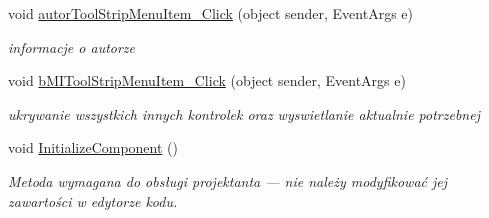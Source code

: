 \begin{DoxyCompactItemize}
void \mbox{\hyperlink{classkalku__all__in__one_1_1_form1_a15b1f2515415730a606a5a66dfe1ff00}{autor\+Tool\+Strip\+Menu\+Item\+\_\+\+Click}} (object sender, Event\+Args e)
\begin{DoxyCompactList}\small\item\em informacje o autorze \end{DoxyCompactList}\item 
\mbox{\label{classkalku__all__in__one_1_1_form1_ac0ccf231a44a19dbaa2a6398531d4f5d}} 
void \mbox{\hyperlink{classkalku__all__in__one_1_1_form1_ac0ccf231a44a19dbaa2a6398531d4f5d}{b\+M\+I\+Tool\+Strip\+Menu\+Item\+\_\+\+Click}} (object sender, Event\+Args e)
\begin{DoxyCompactList}\small\item\em ukrywanie wszystkich innych kontrolek oraz wyswietlanie aktualnie potrzebnej \end{DoxyCompactList}\item 
void \mbox{\hyperlink{classkalku__all__in__one_1_1_form1_acfb7737bb18b9292d406dc92c735c492}{Initialize\+Component}} ()
\begin{DoxyCompactList}\small\item\em Metoda wymagana do obsługi projektanta — nie należy modyfikować jej zawartości w edytorze kodu. \end{DoxyCompactList}\end{DoxyCompactItemize}
